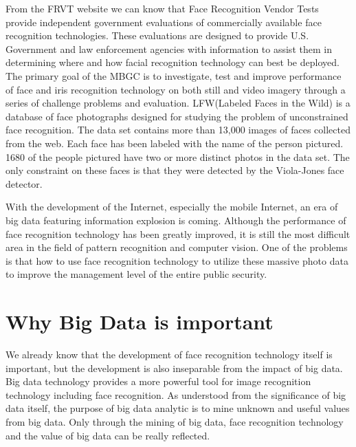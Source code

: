 \documentclass[sigconf]{acmart}
\begin{document}
From the FRVT website we can know that Face Recognition Vendor Tests provide independent government evaluations of commercially available face recognition technologies\cite{FRVT}. These evaluations are designed to provide U.S. Government and law enforcement agencies with information to assist them in determining where and how facial recognition technology can best be deployed\cite{FRVT}. The primary goal of the MBGC is to investigate, test and improve performance of face and iris recognition technology on both still and video imagery through a series of challenge problems and evaluation\cite{MBGC}. LFW(Labeled Faces in the Wild) is a database of face photographs designed for studying the problem of unconstrained face recognition. The data set contains more than 13,000 images of faces collected from the web. Each face has been labeled with the name of the person pictured. 1680 of the people pictured have two or more distinct photos in the data set. The only constraint on these faces is that they were detected by the Viola-Jones face detector\cite{LFW}. 

With the development of the Internet, especially the mobile Internet, an era of big data featuring information explosion is coming. Although the performance of face recognition technology has been greatly improved, it is still the most difficult area in the field of pattern recognition and computer vision. One of the problems is that how to use face recognition technology to utilize these massive photo data to improve the management level of the entire public security.

\section{Why Big Data is important}
We already know that the development of face recognition technology itself is important, but the development is also inseparable from the impact of big data. Big data technology provides a more powerful tool for image recognition technology including face recognition. As understood from the significance of big data itself, the purpose of big data analytic is to mine unknown and useful values from big data. Only through the mining of big data, face recognition technology and the value of big data can be really reflected.
\end{document}
